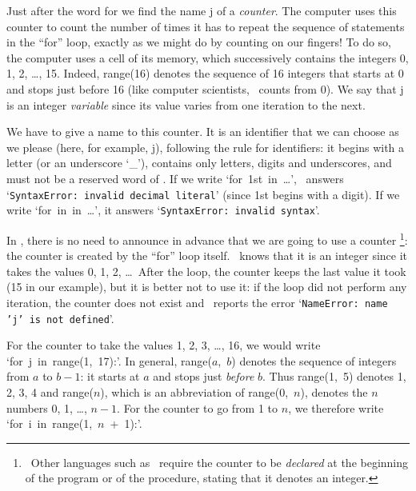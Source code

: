 Just after the word {\mcl for} we find the name {\idt j} of a
{\em counter}. The computer uses this counter to
count the number of times it has to repeat the sequence of statements in the
``for'' loop, exactly as we might do by counting on our fingers!
To do so, the computer uses a cell of its memory, which successively contains
the integers 0, 1, 2, \ldots, 15. Indeed, {\idt range(16)} denotes the sequence of
16 integers that starts at 0 and stops just before 16 (like computer scientists,
\python\ counts from 0). We say that {\idt j} is an integer
{\em variable} since its value varies
from one iteration to the next.

We have to give a name to this counter. It is an identifier that we can choose
as we please (here, for example, {\idt  j}), following the rule for
identifiers: it begins with a letter (or an underscore `\_'), contains only letters, digits and underscores, and must not be a reserved word of
\python. If we write `{\mcl for}\ {\idt 1st}\ {\mcl in}\ \ldots', \python\ answers
`{\tt SyntaxError: invalid decimal literal}' (since
{\idt 1st} begins with a digit). If we write `{\mcl for}\ {\mcl in}\ {\mcl in}\ \ldots',
it answers `{\tt SyntaxError: invalid syntax}'.

In \python, there is no need to announce in advance that we are going to use
a counter%
\footnote{\ Other languages such as \pascal\ require the counter to be {\em declared} at the beginning
of the program or of the procedure, stating that it denotes an integer.}:
the counter is created by the ``for'' loop itself. \python\
knows that it is an integer since it takes the values 0, 1, 2, \ldots\ After the
loop, the counter keeps the last value it took (15 in our example), but
it is better not to use it: if the loop did not perform any iteration, the
counter does not exist and \python\ reports the error
`{\tt NameError: name 'j' is not defined}'.

For the counter to take the values 1, 2, 3, \ldots, 16, we would write
`{\mcl for}\ {\idt j}\ {\mcl in}\ {\idt range(1,\ 17):}'. In general,
{\idt range(}$a${\idt ,\ }$b${\idt )} denotes the sequence of integers from $a$ to $b-1$:
it starts at $a$ and stops just {\em before} $b$. Thus {\idt range(1,\ 5)} denotes
1, 2, 3, 4 and {\idt range(}$n${\idt )}, which is an abbreviation of
{\idt range(0,\ }$n${\idt )}, denotes the $n$ numbers 0, 1, \ldots, $n-1$.
For the counter to go from 1 to $n$, we therefore write
`{\mcl for}\ {\idt i}\ {\mcl in}\ {\idt range(1,\ }$n${\idt \ +\ 1):}'.

